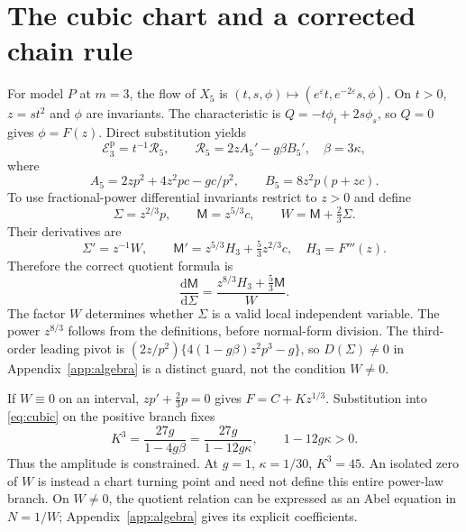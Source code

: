 \documentclass[11pt,a4paper,oneside]{report}
\numberwithin{equation}{chapter}
\newcommand{\E}{\mathcal E}
\newcommand{\R}{\mathcal R}
\newcommand{\dd}{\mathrm d}
\begin{document}
\section{The cubic chart and a corrected chain rule}\label{sec:cubic}
For model $P$ at $m=3$, the flow of $X_5$ is
$(t,s,\phi)\mapsto(e^\varepsilon t,e^{-2\varepsilon}s,\phi)$.
On $t>0$, $z=st^2$ and $\phi$ are invariants. The characteristic is
$Q=-t\phi_t+2s\phi_s$, so $Q=0$ gives $\phi=F(z)$.
Direct substitution yields
\begin{equation}\label{eq:cubic}
\E_3^{\mathrm p}=t^{-1}\R_5,\qquad
\R_5=2zA_5'-g\beta B_5',\quad\beta=3\kappa,
\end{equation}
where
\begin{equation}
A_5=2zp^2+4z^2pc-gc/p^2,\qquad
B_5=8z^2p(p+zc).
\end{equation}
To use fractional-power differential invariants restrict to $z>0$ and define
\begin{equation}
\Sigma=z^{2/3}p,\qquad \mathsf M=z^{5/3}c,
\qquad W=\mathsf M+\tfrac23\Sigma.
\end{equation}
Their derivatives are
\begin{equation}
\Sigma'=z^{-1}W,\qquad
\mathsf M'=z^{5/3}H_3+\tfrac53z^{2/3}c,
\quad H_3=F'''(z).
\end{equation}
Therefore the correct quotient formula is
\begin{equation}\boxed{\displaystyle
\frac{\dd\mathsf M}{\dd\Sigma}
=\frac{z^{8/3}H_3+\tfrac53\mathsf M}{W}.}\label{eq:chain-correct}
\end{equation}
The factor $W$ determines whether $\Sigma$ is a valid local independent variable.
The power $z^{8/3}$ follows from the definitions, before normal-form division.
The third-order leading pivot is
$(2z/p^2)\{4(1-g\beta)z^2p^3-g\}$, so $D(\Sigma)\ne0$ in
Appendix~\ref{app:algebra} is a distinct guard, not the condition $W\ne0$.

If $W\equiv0$ on an interval, $zp'+\tfrac23p=0$ gives
$F=C+Kz^{1/3}$. Substitution into \eqref{eq:cubic} on the positive branch fixes
\begin{equation}\label{eq:power}
K^3=\frac{27g}{1-4g\beta}=\frac{27g}{1-12g\kappa},\qquad 1-12g\kappa>0.
\end{equation}
Thus the amplitude is constrained. At $g=1$, $\kappa=1/30$, $K^3=45$. An isolated zero of $W$ is instead a chart turning point and need not define this entire power-law branch. On $W\ne0$, the quotient relation can be expressed as an Abel equation in $N=1/W$; Appendix~\ref{app:algebra} gives its explicit coefficients.
\end{document}
